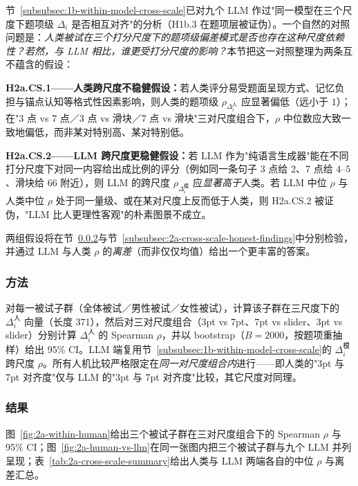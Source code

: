 \documentclass[UTF8,12pt]{ctexart}
\begin{document}
节~\ref{subsubsec:1b-within-model-cross-scale}已对九个 LLM 作过"同一模型在三个尺度下题项级 $\Delta_i$ 是否相互对齐"的分析（H1b.3 在题项层被证伪）。一个自然的对照问题是：\emph{人类被试在三个打分尺度下的题项级偏差模式是否也存在这种尺度依赖性？若然，与 LLM 相比，谁更受打分尺度的影响？}本节把这一对照整理为两条互不蕴含的假设：

\textbf{H2a.CS.1——人类跨尺度不稳健假设：}若人类评分易受题面呈现方式、记忆负担与锚点认知等格式性因素影响，则人类的题项级 $\rho_{\Delta_i^{\text{人}}}$ 应显著偏低（远小于 $1$）；在"3 点 vs 7 点／3 点 vs 滑块／7 点 vs 滑块"三对尺度组合下，$\rho$ 中位数应大致一致地偏低，而非某对特别高、某对特别低。

\textbf{H2a.CS.2——LLM 跨尺度更稳健假设：}若 LLM 作为"纯语言生成器"能在不同打分尺度下对同一内容给出成比例的评分（例如同一条句子 3 点给 2、7 点给 $4$--$5$、滑块给 $66$ 附近），则 LLM 的跨尺度 $\rho_{\Delta_i^{\text{模}}}$ 应\emph{显著高于}人类。若 LLM 中位 $\rho$ 与人类中位 $\rho$ 处于同一量级、或在某对尺度上反而低于人类，则 H2a.CS.2 被证伪，"LLM 比人更理性客观"的朴素图景不成立。

两组假设将在节~\ref{subsubsec:2a-cross-scale-results}与节~\ref{subsubsec:2a-cross-scale-honest-findings}中分别检验，并通过 LLM 与人类 $\rho$ 的\emph{离差}（而非仅仅均值）给出一个更丰富的答案。

\subsubsection{方法}

对每一被试子群（全体被试／男性被试／女性被试），计算该子群在三尺度下的 $\Delta_i^{\text{人}}$ 向量（长度 371），然后对三对尺度组合（3pt vs 7pt、7pt vs slider、3pt vs slider）分别计算 $\Delta_i^{\text{人}}$ 的 Spearman $\rho$，并以 bootstrap（$B=2000$，按题项重抽样）给出 95\% CI。LLM 端复用节~\ref{subsubsec:1b-within-model-cross-scale}的 $\Delta_i^{\text{模}}$ 跨尺度 $\rho$。所有人机比较严格限定在\emph{同一对尺度组合内}进行——即人类的"3pt 与 7pt 对齐度"仅与 LLM 的"3pt 与 7pt 对齐度"比较，其它尺度对同理。

\subsubsection{结果}
\label{subsubsec:2a-cross-scale-results}

图~\ref{fig:2a-within-human}给出三个被试子群在三对尺度组合下的 Spearman $\rho$ 与 95\% CI；图~\ref{fig:2a-human-vs-llm}在同一张图内把三个被试子群与九个 LLM 并列呈现；表~\ref{tab:2a-cross-scale-summary}给出人类与 LLM 两端各自的中位 $\rho$ 与离差汇总。
\end{document}
